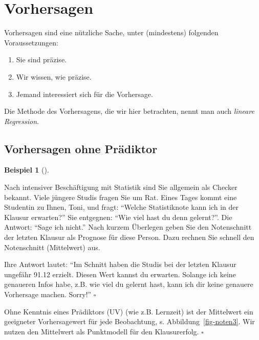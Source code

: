 \documentclass[
  letterpaper,
  twoside,
  open=any]{scrbook}
\providecommand{\tightlist}{%
  \setlength{\itemsep}{0pt}\setlength{\parskip}{0pt}}\usepackage{longtable,booktabs,array}
\theoremstyle{definition}
\theoremstyle{definition}
\newtheorem{example}{Beispiel}[chapter]
\theoremstyle{definition}
\theoremstyle{remark}
\begin{document}
\section{Vorhersagen}\label{vorhersagen}

Vorhersagen sind eine nützliche Sache, unter (mindestens) folgenden
Voraussetzungen:

\begin{enumerate}
\def\labelenumi{\arabic{enumi}.}
\tightlist
\item
  Sie sind präzise.
\item
  Wir wissen, wie präzise.
\item
  Jemand interessiert sich für die Vorhersage.
\end{enumerate}

Die Methode des Vorhersagens, die wir hier betrachten, nennt man auch
\emph{lineare Regression}.

\subsection{Vorhersagen ohne
Prädiktor}\label{vorhersagen-ohne-pruxe4diktor}

\begin{example}[]\protect\hypertarget{exm-noten-prognose}{}\label{exm-noten-prognose}

Nach intensiver Beschäftigung mit Statistik sind Sie allgemein als
Checker bekannt. Viele jüngere Studis fragen Sie um Rat. Eines Tages
kommt eine Studentin zu Ihnen, Toni, und fragt: \enquote{Welche
Statistiknote kann ich in der Klausur erwarten?} Sie entgegnen:
\enquote{Wie viel hast du denn gelernt?}. Die Antwort: \enquote{Sage ich
nicht.} Nach kurzem Überlegen geben Sie den Notenschnitt der letzten
Klausur als Prognose für diese Person. Dazu rechnen Sie schnell den
Notenschnitt (Mittelwert) aus.

Ihre Antwort lautet: \enquote{Im Schnitt haben die Studis bei der
letzten Klausur ungefähr 91.12 erzielt. Diesen Wert kannst du erwarten.
Solange ich keine genaueren Infos habe, z.B. wie viel du gelernt hast,
kann ich dir keine genauere Vorhersage machen. Sorry!} \(\square\)

\end{example}

Ohne Kenntnis eines Prädiktors (UV) (wie z.B. Lernzeit) ist der
Mittelwert ein geeigneter Vorhersagewert für jede Beobachtung, s.
Abbildung~\ref{fig-noten3}. Wir nutzen den Mittelwert als Punktmodell
für den Klausurerfolg. \(\square\)
\end{document}
